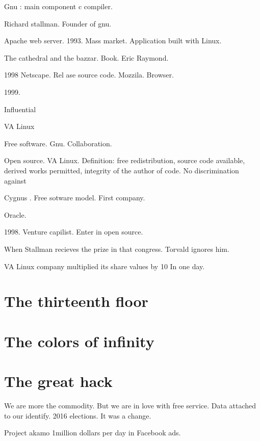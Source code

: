   
  
  Gnu : main component c compiler. 
  
  Richard stallman. Founder of gnu. 
  
  Apache web server. 1993. Mass market. 
  Application built with Linux. 
  
  
  The cathedral and the bazzar. Book. Eric Raymond. 
  
  
  
  1998 Netscape. Rel ase source code. Mozzila. Browser. 
  
  1999. 
  
  Influential 
  
  
  VA Linux 
  
  Free software. Gnu. Collaboration. 
  
  Open source. VA Linux. 
  Definition: free redistribution, source code available, derived works permitted, integrity of the author of code. No discrimination against 
  
  Cygnus . Free sotware model.  First company. 
  
  Oracle. 
  
  1998. Venture capilist. Enter in open source. 
  
  When Stallman recieves the prize in that congress. Torvald ignores him. 
  
  VA Linux company multiplied its share values by 10 In one day. 
  
 
 
 
    
  \section{The thirteenth floor} 
  
   \section{The colors of infinity} 
   
 
  
  \section{The great hack}
  
  We are more the commodity. But we are in love with free service. Data attached to our identify. 
  2016 elections. It was a change. 
  
  Project akamo 1million dollars per day in Facebook ads. 
  

